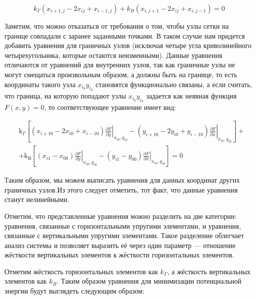 \documentclass[a4paper,14pt,russian]{extreport}
\renewcommand{\_}{\kern-1.5pt\textunderscore\kern-1.5pt}
\begin{document}
    \begin{equation}
    k_{\Gamma} \left(x_{i+1,j} - 2x_{ij} + x_{i-1,j}\right) + k_{B} \left(x_{i,j+1} - 2x_{ij} + x_{i,j-1}\right) = 0
    \end{equation}
    

    \par Заметим, что можно отказаться от требования о том, чтобы узлы сетки на границе совпадали с заранее заданными точками. В таком случае нам придется добавить уравнения для граничных узлов (исключая четыре угла криволинейного четырехугольника, которые остаются неизменными). Данные уравнения отличаются от уравнений для внутренних узлов, так как граничные узлы не могут смещаться произвольным образом, а должны быть на границе, то есть координаты такого узла $x_{i_0} y_{i_0}$ становятся функционально связаны, а если считать, что граница, на которую попадают узлы $x_{i_0} y_{i_0}$ задается как неявная функция $F(x,y) = 0$, то соответствующее уравнение имеет вид:

$$
\begin{aligned}
& \mathrm{k}_{\Gamma}\left[\left.\left(x_{i+10}-2 x_{i 0}+x_{i-10}\right) \frac{\partial F}{\partial y}\right|_{x_{i 0}, y_{i 0}}-\left.\left(y_{i+10}-2 y_{i 0}+y_{i-10}\right) \frac{\partial F}{\partial x}\right|_{x_{i 0}, y_{i 0}}\right]+ \\
& +\mathrm{k}_{\mathrm{B}}\left[\left.\left(x_{i 1}-x_{00}\right) \frac{\partial F}{\partial y}\right|_{x_{i 0}, y_{i 0}}-\left.\left(y_{i 1}-y_{00}\right) \frac{\partial F}{\partial x}\right|_{x_{i 0}, y_{i 0}}\right]=0
\end{aligned}
$$

    \par Таким образом, мы можем выписать уравнения для данных координат других граничных узлов.Из этого следует отметить, тот факт, что данные уравнения станут нелинейными.
    \par Отметим, что представленные уравнения можно разделить на две категории: уравнения, связанные с горизонтальными упругими элементами, и уравнения, связанные с вертикальными упругими элементами. Такое разделение облегчает анализ системы и позволяет выразить её через один параметр — отношение жёсткости вертикальных элементов к жёсткости горизонтальных элементов.

\par Отметим жёсткость горизонтальных элементов как \(k_{\Gamma}\), а жёсткость вертикальных элементов как \(k_{B}\). Таким образом уравнения для минимизации потенциальной энергии будут выглядеть следующим образом:
\end{document}
